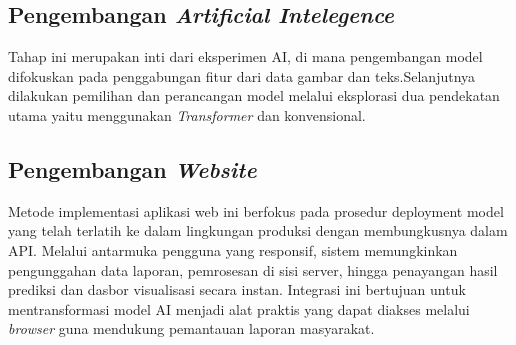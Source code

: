     \subsection{Pengembangan  \textit{Artificial Intelegence}}
    Tahap ini merupakan inti dari eksperimen AI, di mana pengembangan model difokuskan pada penggabungan fitur dari data gambar dan teks.Selanjutnya dilakukan pemilihan dan perancangan model melalui eksplorasi dua pendekatan utama yaitu menggunakan \textit{Transformer} dan konvensional. 
    \subsection {Pengembangan  \textit{Website}}
    Metode implementasi aplikasi web ini berfokus pada prosedur deployment model yang telah terlatih ke dalam lingkungan produksi dengan membungkusnya dalam API. Melalui antarmuka pengguna yang responsif, sistem memungkinkan pengunggahan data laporan, pemrosesan di sisi server, hingga penayangan hasil prediksi dan dasbor visualisasi secara instan. Integrasi ini bertujuan untuk mentransformasi model AI menjadi alat praktis yang dapat diakses melalui \textit{browser} guna mendukung pemantauan laporan masyarakat. 